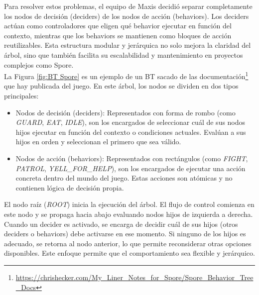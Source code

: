 Para resolver estos problemas, el equipo de Maxis decidió separar completamente los nodos de decisión (deciders) de los nodos de acción (behaviors). Los deciders actúan como controladores que eligen qué behavior ejecutar en función del contexto, mientras que los behaviors se mantienen como bloques de acción reutilizables. Esta estructura modular y jerárquica no solo mejora la claridad del árbol, sino que también facilita su escalabilidad y mantenimiento en proyectos complejos como Spore.\\

La Figura \ref{fig:BT Spore} es un ejemplo de un BT sacado de las documentación\footnote{ \url{https://chrishecker.com/My_Liner_Notes_for_Spore/Spore_Behavior_Tree_Docs}} que hay publicada del juego.
En este árbol, los nodos se dividen en dos tipos principales:
\begin{itemize}
\item Nodos de decisión (deciders): Representados con forma de rombo (como \textit{GUARD}, \textit{EAT}, \textit{IDLE}), son los encargados de seleccionar cuál de sus nodos hijos ejecutar en función del contexto o condiciones actuales. Evalúan a sus hijos en orden y seleccionan el primero que sea válido.
\item Nodos de acción (behaviors): Representados con rectángulos (como \textit{FIGHT}, \textit{PATROL}, \textit{YELL\_FOR\_HELP}), son los encargados de ejecutar una acción concreta dentro del mundo del juego. Estas acciones son atómicas y no contienen lógica de decisión propia.
\end{itemize}

El nodo raíz (\textit{ROOT}) inicia la ejecución del árbol. El flujo de control comienza en este nodo y se propaga hacia abajo evaluando nodos hijos de izquierda a derecha. Cuando un decider es activado, se encarga de decidir cuál de sus hijos (otros deciders o behaviors) debe activarse en ese momento. Si ninguno de los hijos es adecuado, se retorna al nodo anterior, lo que permite reconsiderar otras opciones disponibles. Este enfoque permite que el comportamiento sea flexible y jerárquico.\\

